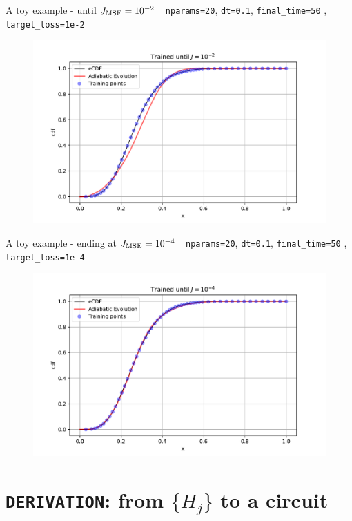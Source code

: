 \documentclass[8pt, xcolor={svgnames}, hyperref={colorlinks, linkcolor=black, citecolor=amethyst, urlcolor=amethyst}]{beamer}
\begin{document}
\begin{frame}[fragile]{A toy example - until $J_{\rm MSE}=10^{-2}$}
\large
\faArrowCircleRight\,\, \texttt{nparams=20}, \texttt{dt=0.1}, \texttt{final\_time=50}
, \texttt{target\_loss=1e-2}
\begin{figure}
    \includegraphics[width=1\textwidth]{figures/ev2.pdf}
\end{figure}
\end{frame}

\begin{frame}[fragile]{A toy example - ending at $J_{\rm MSE}=10^{-4}$}
\large
\faArrowCircleRight\,\, \texttt{nparams=20}, \texttt{dt=0.1}, \texttt{final\_time=50}
, \texttt{target\_loss=1e-4}
\begin{figure}
    \includegraphics[width=1\textwidth]{figures/ev3.pdf}
\end{figure}
\end{frame}

\section{\texttt{DERIVATION}: from $\{H_j\}$ to a circuit}
\end{document}
